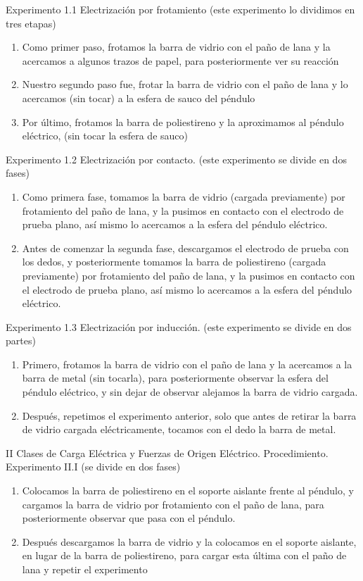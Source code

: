 \documentclass[14pt]{article}
\begin{document}
	Experimento 1.1 Electrización por frotamiento 
	(este experimento lo dividimos en tres etapas) 
	\begin{enumerate}
		\item Como primer paso, frotamos la barra de vidrio con el paño de lana y la acercamos a algunos trazos de papel, para posteriormente ver su reacción 
		\item Nuestro segundo paso fue, frotar la barra de vidrio con el paño de lana y lo acercamos (sin tocar) a la esfera de sauco del péndulo 
		\item Por último, frotamos la barra de poliestireno y la aproximamos al péndulo eléctrico, (sin tocar la esfera de sauco)
	\end{enumerate}
	Experimento 1.2 Electrización por contacto. 
(este experimento se divide en dos fases) 
\begin{enumerate}
	\item Como primera fase, tomamos la barra de vidrio (cargada previamente) por frotamiento del paño de lana, y la pusimos en contacto con el electrodo de prueba plano, así mismo lo acercamos a la esfera del péndulo eléctrico. 
	\item Antes de comenzar la segunda fase, descargamos el electrodo de prueba con los dedos, y posteriormente tomamos la barra de poliestireno (cargada previamente) por frotamiento del paño de lana, y la pusimos en contacto con el electrodo de prueba plano, así mismo lo acercamos a la esfera del péndulo eléctrico.  
\end{enumerate}
Experimento 1.3 Electrización por inducción. 
(este experimento se divide en dos partes) 
\begin{enumerate}
	\item Primero, frotamos la barra de vidrio con el paño de lana y la acercamos a la barra de metal (sin tocarla), para posteriormente observar la esfera del péndulo eléctrico, y sin dejar de observar alejamos la barra de vidrio cargada.
	\item Después, repetimos el experimento anterior, solo que antes de retirar la barra de vidrio cargada eléctricamente, tocamos con el dedo la barra de metal. 
\end{enumerate}
II Clases de Carga Eléctrica y Fuerzas de Origen Eléctrico.
Procedimiento. Experimento II.I
(se divide en dos fases)
\begin{enumerate}
	\item Colocamos la barra de poliestireno en el soporte aislante frente al péndulo, y cargamos la barra de vidrio por frotamiento con el paño de lana, para posteriormente observar que pasa con el péndulo. 
	\item Después descargamos la barra de vidrio y la colocamos en el soporte aislante, en lugar de la barra de poliestireno, para cargar esta última con el paño de lana y repetir el experimento   
\end{enumerate}
\end{document}
